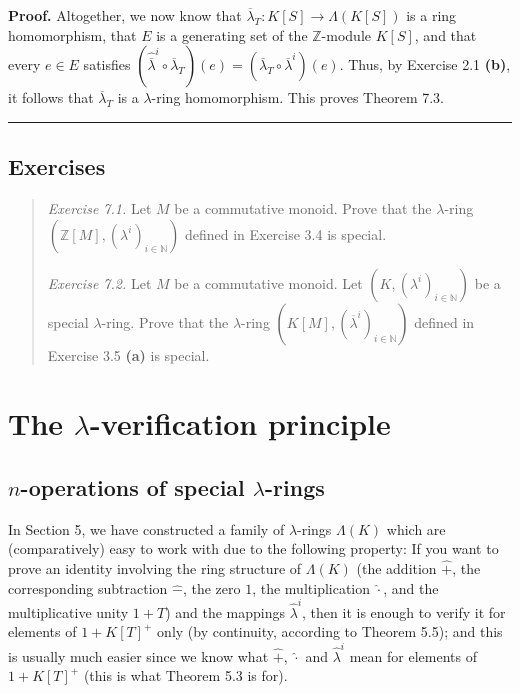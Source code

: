 \documentclass[numbers=enddot,12pt,final,onecolumn,notitlepage]{scrartcl}%
\newenvironment{proof}[1][Proof]{\noindent\textbf{#1.} }{\ \rule{0.5em}{0.5em}}
\begin{document}
\begin{proof}
Altogether, we now know that $\overline{\lambda}_{T}:K\left[  S\right]
\rightarrow\Lambda\left(  K\left[  S\right]  \right)  $ is a ring
homomorphism, that $E$ is a generating set of the $\mathbb{Z}$-module
$K\left[  S\right]  $, and that every $e\in E$ satisfies $\left(
\widehat{\overline{\lambda}}^{i}\circ\overline{\lambda}_{T}\right)  \left(
e\right)  =\left(  \overline{\lambda}_{T}\circ\overline{\lambda}^{i}\right)
\left(  e\right)  $. Thus, by Exercise 2.1 \textbf{(b)}, it follows that
$\overline{\lambda}_{T}$ is a $\lambda$-ring homomorphism. This proves Theorem 7.3.
\end{proof}

\subsection{Exercises}

\begin{quotation}
\textit{Exercise 7.1.} Let $M$ be a commutative monoid. Prove that the
$\lambda$-ring $\left(  \mathbb{Z}\left[  M\right]  ,\left(  \lambda
^{i}\right)  _{i\in\mathbb{N}}\right)  $ defined in Exercise 3.4 is special.

\textit{Exercise 7.2.} Let $M$ be a commutative monoid. Let $\left(  K,\left(
\lambda^{i}\right)  _{i\in\mathbb{N}}\right)  $ be a special $\lambda$-ring.
Prove that the $\lambda$-ring $\left(  K\left[  M\right]  ,\left(
\overline{\lambda}^{i}\right)  _{i\in\mathbb{N}}\right)  $ defined in Exercise
3.5 \textbf{(a)} is special.
\end{quotation}

\section{The $\lambda$-verification principle}

\subsection{$n$-operations of special $\lambda$-rings}

In Section 5, we have constructed a family of $\lambda$-rings $\Lambda\left(
K\right)  $ which are (comparatively) easy to work with due to the following
property: If you want to prove an identity involving the ring structure of
$\Lambda\left(  K\right)  $ (the addition $\widehat{+}$, the corresponding
subtraction $\widehat{-}$, the zero $1$, the multiplication $\widehat{\cdot}$,
and the multiplicative unity $1+T$) and the mappings $\widehat{\lambda}^{i}$,
then it is enough to verify it for elements of $1+K\left[  T\right]  ^{+}$
only (by continuity, according to Theorem 5.5); and this is usually much
easier since we know what $\widehat{+}$, $\widehat{\cdot}$ and
$\widehat{\lambda}^{i}$ mean for elements of $1+K\left[  T\right]  ^{+}$ (this
is what Theorem 5.3 is for).
\end{document}
